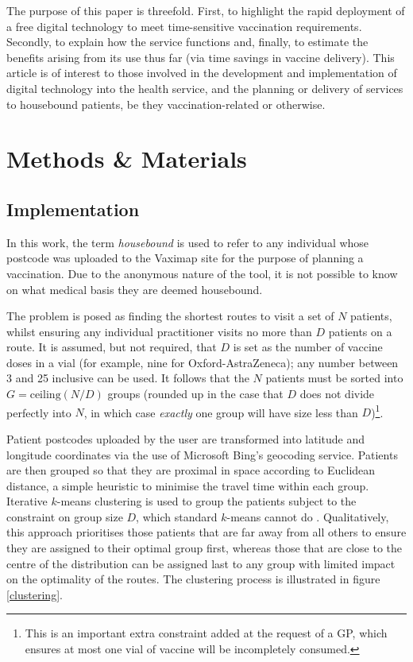 \documentclass{article}
\begin{document}
The purpose of this paper is threefold. First, to highlight the rapid deployment of a free digital technology to meet time-sensitive vaccination requirements. Secondly, to explain how the service functions and, finally, to estimate the benefits arising from its use thus far (via time savings in vaccine delivery). This article is of interest to those involved in the development and implementation of digital technology into the health service, and the planning or delivery of services to housebound patients, be they vaccination-related or otherwise.

\section{Methods \& Materials}
\subsection{Implementation}

In this work, the term \textit{housebound} is used to refer to any individual whose postcode was uploaded to the Vaximap site for the purpose of planning a vaccination. Due to the anonymous nature of the tool, it is not possible to know on what medical basis they are deemed housebound. 

The problem is posed as finding the shortest routes to visit a set of $N$ patients, whilst ensuring any individual practitioner visits no more than $D$ patients on a route. It is assumed, but not required, that $D$ is set as the number of vaccine doses in a vial (for example, nine for Oxford-AstraZeneca); any number between 3 and 25 inclusive can be used. It follows that the $N$ patients must be sorted into $G = \mathrm{ceiling}(N/D)$ groups (rounded up in the case that $D$ does not divide perfectly into $N$, in which case \textit{exactly} one group will have size less than $D$)\footnote{This is an important extra constraint added at the request of a GP, which ensures at most one vial of vaccine will be incompletely consumed.}. 

Patient postcodes uploaded by the user are transformed into latitude and longitude coordinates via the use of Microsoft Bing's geocoding service. Patients are then grouped so that they are proximal in space according to Euclidean distance, a simple heuristic to minimise the travel time within each group. Iterative $k$-means clustering is used to group the patients subject to the constraint on group size $D$, which standard $k$-means cannot do \cite{macqueen1967some, davidson2005clustering}. Qualitatively, this approach prioritises those patients that are far away from all others to ensure they are assigned to their optimal group first, whereas those that are close to the centre of the distribution can be assigned last to any group with limited impact on the optimality of the routes. The clustering process is illustrated in figure \ref{clustering}. 
\end{document}
